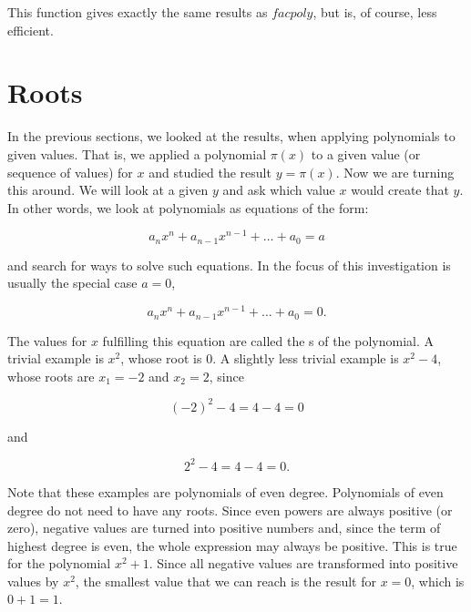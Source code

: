 \documentclass[tikz]{scrreprt}
\newcommand{\Varid}[1]{\mathit{#1}}
\begin{document}
This function gives exactly the same results as \ensuremath{\Varid{facpoly}},
but is, of course, less efficient.

\section{Roots}

In the previous sections, we looked at the results,
when applying polynomials to given values.
That is, we applied a polynomial $\pi(x)$ to
a given value (or sequence of values) for $x$ 
and studied the result $y = \pi(x)$.
Now we are turning this around. We will look at
a given $y$ and ask which value $x$ would
create that $y$. In other words, 
we look at polynomials as equations of the form:

\begin{equation}
a_nx^n + a_{n-1}x^{n-1} + \dots + a_0 = a
\end{equation}

and search for ways to solve such equations.
In the focus of this investigation is usually
the special case $a=0$, \ie\:

\begin{equation}
a_nx^n + a_{n-1}x^{n-1} + \dots + a_0 = 0.
\end{equation}

The values for $x$ fulfilling this equation
are called the s of the polynomial.
A trivial example is $x^2$, whose root is 0.
A slightly less trivial example is $x^2 - 4$,
whose roots are $x_1 = -2$ and $x_2 = 2$, since

\[
(-2)^2 - 4 = 4 - 4 = 0
\]

and

\[
2^2 - 4 = 4 - 4 = 0.
\]

Note that these examples are polynomials of even degree.
Polynomials of even degree do not need to have any roots.
Since even powers are always positive (or zero), negative values
are turned into positive numbers and, since the term of highest
degree is even, the whole expression may always be positive.
This is true for the polynomial $x^2 + 1$. Since all negative values
are transformed into positive values by $x^2$, the smallest value
that we can reach is the result for $x=0$, which is $0+1=1$.
\end{document}
